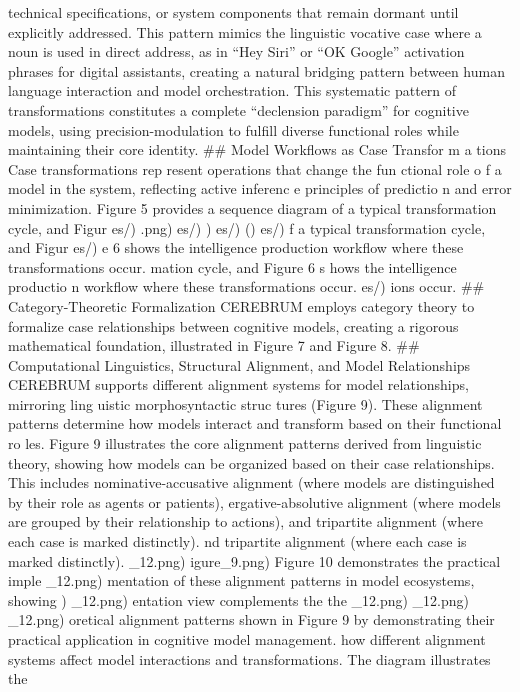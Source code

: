 \documentclass[
  11pt,
  letterpaper,
]{article}
\begin{document}
technical specifications, or system components that remain dormant until
explicitly addressed. This pattern mimics the linguistic vocative case
where a noun is used in direct address, as in ``Hey Siri'' or ``OK
Google'' activation phrases for digital assistants, creating a natural
bridging pattern between human language interaction and model
orchestration. This systematic pattern of transformations constitutes a
complete ``declension paradigm'' for cognitive models, using
precision-modulation to fulfill diverse functional roles while
maintaining their core identity. \#\# Model Workflows as Case Transfor m
a tions Case transformations rep resent operations that change the fun
ctional role o f a model in the system, reflecting active inferenc e
principles of predictio n and error minimization. Figure 5 provides a
sequence diagram of a typical transformation cycle, and Figur es/) .png)
es/) ) es/) () es/) f a typical transformation cycle, and Figur es/) e 6
shows the intelligence production workflow where these transformations
occur. mation cycle, and Figure 6 s hows the intelligence productio n
workflow where these transformations occur. es/) ions occur. \#\#
Category-Theoretic Formalization CEREBRUM employs category theory to
formalize case relationships between cognitive models, creating a
rigorous mathematical foundation, illustrated in Figure 7 and Figure 8.
\#\# Computational Linguistics, Structural Alignment, and Model
Relationships CEREBRUM supports different alignment systems for model
relationships, mirroring ling uistic morphosyntactic struc tures (Figure
9). These alignment patterns determine how models interact and transform
based on their functional ro les. Figure 9 illustrates the core
alignment patterns derived from linguistic theory, showing how models
can be organized based on their case relationships. This includes
nominative-accusative alignment (where models are distinguished by their
role as agents or patients), ergative-absolutive alignment (where models
are grouped by their relationship to actions), and tripartite alignment
(where each case is marked distinctly). nd tripartite alignment (where
each case is marked distinctly). \_12.png) igure\_9.png) Figure 10
demonstrates the practical imple \_12.png) mentation of these alignment
patterns in model ecosystems, showing ) \_12.png) entation view
complements the the \_12.png) \_12.png) \_12.png) oretical alignment
patterns shown in Figure 9 by demonstrating their practical application
in cognitive model management. how different alignment systems affect
model interactions and transformations. The diagram illustrates the
\end{document}

